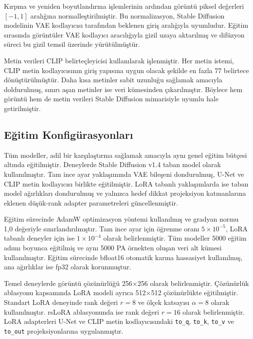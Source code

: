 \documentclass[11pt]{article}
\begin{document}
Kırpma ve yeniden boyutlandırma işlemlerinin ardından görüntü piksel değerleri
$[-1,1]$ aralığına normalleştirilmiştir. Bu normalizasyon, Stable Diffusion
modelinin VAE kodlayıcısı tarafından beklenen giriş aralığıyla uyumludur.
Eğitim sırasında görüntüler VAE kodlayıcı aracılığıyla gizil uzaya
aktarılmış ve difüzyon süreci bu gizil temsil üzerinde yürütülmüştür.

Metin verileri CLIP belirteçleyicisi kullanılarak işlenmiştir. Her metin istemi,
CLIP metin kodlayıcısının giriş yapısına uygun olacak şekilde en fazla 77
belirtece dönüştürülmüştür. Daha kısa metinler sabit uzunluğu sağlamak amacıyla
doldurulmuş, sınırı aşan metinler ise veri kümesinden çıkarılmıştır. Böylece
hem görüntü hem de metin verileri Stable Diffusion mimarisiyle uyumlu hale
getirilmiştir.

\subsection{Eğitim Konfigürasyonları}

Tüm modeller, adil bir karşılaştırma sağlamak amacıyla aynı genel eğitim
bütçesi altında eğitilmiştir. Deneylerde Stable Diffusion v1.4 taban model
olarak kullanılmıştır. Tam ince ayar yaklaşımında VAE bileşeni dondurulmuş,
U-Net ve CLIP metin kodlayıcısı birlikte eğitilmiştir. LoRA tabanlı
yaklaşımlarda ise taban model ağırlıkları dondurulmuş ve yalnızca hedef dikkat
projeksiyon katmanlarına eklenen düşük-rank adapter parametreleri
güncellenmiştir.

Eğitim sürecinde AdamW optimizasyon yöntemi kullanılmış ve gradyan normu
1,0 değeriyle sınırlandırılmıştır. Tam ince ayar için öğrenme oranı
$5\times10^{-5}$, LoRA tabanlı deneyler için ise $1\times10^{-4}$ olarak
belirlenmiştir. Tüm modeller 5000 eğitim adımı boyunca eğitilmiş ve aynı
5000 PA örnekten oluşan veri alt kümesi kullanılmıştır. Eğitim sürecinde
bfloat16 otomatik karma hassasiyet kullanılmış, ana ağırlıklar ise fp32 olarak
korunmuştur.

Temel deneylerde görüntü çözünürlüğü 256$\times$256 olarak belirlenmiştir.
Çözünürlük ablasyonu kapsamında LoRA modeli ayrıca 512$\times$512 çözünürlükte
eğitilmiştir. Standart LoRA deneyinde rank değeri $r=8$ ve ölçek katsayısı
$\alpha=8$ olarak kullanılmıştır. rsLoRA ablasyonunda ise rank değeri $r=16$
olarak belirlenmiştir. LoRA adapterleri U-Net ve CLIP metin kodlayıcısındaki
\texttt{to\_q}, \texttt{to\_k}, \texttt{to\_v} ve \texttt{to\_out}
projeksiyonlarına uygulanmıştır.
\end{document}
